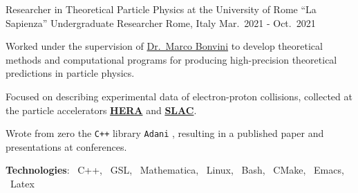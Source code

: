 \begin{cventries}
    \cventry
{Researcher in Theoretical Particle Physics at the University of Rome ``La Sapienza''}
{Undergraduate Researcher}
{Rome, Italy}
{Mar.\ 2021 - Oct.\ 2021}
{
      \begin{cvitems} %
        \item Worked under the supervision of \href{https://inspirehep.net/authors/1058479?ui-citation-summary=true}{Dr.\ Marco Bonvini} to develop theoretical methods and computational programs for producing high-precision theoretical predictions in particle physics.
        \item Focused on describing experimental data of electron-proton collisions, collected at the particle accelerators \href{https://en.wikipedia.org/wiki/HERA_(particle_accelerator)}{\textbf{HERA}} and \href{https://en.wikipedia.org/wiki/SLAC_National_Accelerator_Laboratory}{\textbf{SLAC}}.
        \item Wrote from zero the \texttt{C++} library \texttt{Adani} \href{https://github.com/niclaurenti/adani}{\githublogo}, resulting in a published paper and presentations at conferences.
        \item[] \textbf{\textcolor{awesome-red}{Tec}hnologies}: \cpplogo{}~C++, \gnulogo{}~GSL, \mathematicalogo{}~Mathematica, \linuxlogo{}~Linux, \bashlogo{}~Bash, \cmakelogo{}~CMake, \emacslogo{}~Emacs, \latexlogo{}~Latex
      \end{cvitems}
    }

\end{cventries}